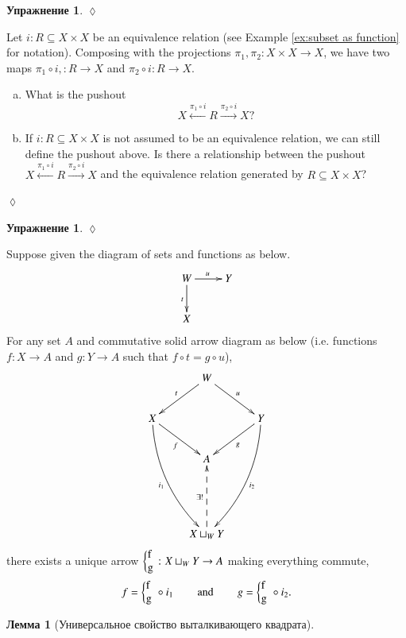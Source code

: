 \documentclass[a4paper]{book}
\def\hsp{\hspace{.3in}}
\def\to{\rightarrow}
\def\taking{\colon}
\def\ss{\subseteq}
\newcommand{\To}[1]{\xrightarrow{#1}}
\newcommand{\From}[1]{\xleftarrow{#1}}
\newcommand{\coprodmap}[2]{{\left\{\parbox{.1in}{#1\\#2}\right.}}
\newcommand{\po}[3]{\coprodmap{#1}{#2}}
\theoremstyle{myth}
\newtheorem{lemmaENG}[envENG]{\begin{english}Lemma\end{english}}
\newtheorem{excENG}[envENG]{\begin{english}Exercise\end{english}}
\newenvironment{exerciseENG}{\begin{excENG}}{\hspace*{\fill}$\lozenge$\end{excENG}}
\newtheorem{lemmaRUS}[envRUS]{Лемма}
\newtheorem{excRUS}[envRUS]{Упражнение}
\newenvironment{exerciseRUS}{\begin{excRUS}}{\hspace*{\fill}$\lozenge$\end{excRUS}}
\def\sexc{\begin{enumerate}[a.)]\setlength{\itemsep}{.1cm}\setlength{\parskip}{.1cm}\item}
\def\next{\item}
\def\endsexc{\end{enumerate}}
\begin{document}
\begin{russian}
\begin{exerciseRUS}
 
\end{exerciseRUS}

\begin{exerciseENG}
Let $i\taking R\ss X\times X$ be an equivalence relation (see Example \ref{ex:subset as function} for notation). Composing with the projections $\pi_1,\pi_2\taking X\times X\to X$, we have two maps $\pi_1\circ i,\taking R\to X$ and $\pi_2\circ i\taking R\to X$. 
\sexc What is the pushout $$X\From{\pi_1\circ i}R\To{\pi_2\circ i}X?$$ 
\next If $i\taking R\ss X\times X$ is not assumed to be an equivalence relation, we can still define the pushout above. Is there a relationship between the pushout $X\From{\pi_1\circ i}R\To{\pi_2\circ i}X$ and the equivalence relation generated by $R\ss X\times X$?
\endsexc
\end{exerciseENG}

\begin{exerciseRUS}
 
\end{exerciseRUS}

\begin{lemmaENG}\label{lemma:up for po}
Suppose given the diagram of sets and functions as below.
\begin{align*}
\xymatrix{W\ar[r]^u\ar[d]_t&Y\\
X}
\end{align*}
For any set $A$ and commutative solid arrow diagram as below (i.e. functions $f\taking X\to A$ and $g\taking Y\to A$ such that $f\circ t=g\circ u$), 
\begin{align}\label{dia:universal property of po}
\xymatrix{
&W\ar[dr]^u\ar[dl]_t\\
X\ar@/_1pc/[dddr]_{i_1}\ar[rd]_f&&Y\ar@/^1pc/[dddl]^{i_2}\ar[dl]^g\\
&A\\\\
&X\sqcup_WY\ar@{-->}[uu]^{\exists!}
}
\end{align}
there exists a unique arrow $\po{f}{g}{W}\taking X\sqcup_WY\to A$ making everything commute, $$f=\po{f}{g}{W}\circ i_1\hsp\text{and}\hsp g=\po{f}{g}{W}\circ i_2.$$
\end{lemmaENG}

\begin{lemmaRUS}[Универсальное свойство выталкивающего квадрата]\label{lemma:up for po}
 
\end{lemmaRUS}


\end{russian}
\end{document}
